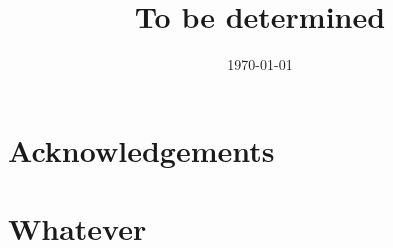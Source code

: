 \documentclass[a4paper,10pt,oneside, fleqn]{article}
\title{To be determined}
\date{\today}
\begin{document}
\maketitle

\pagestyle{fancy}               	%

\vspace*{\fill}
\begin{abstract}

\end{abstract}
\vspace*{\fill}
\newpage

\tableofcontents
\newpage




\section{Acknowledgements}


\newpage 

\appendix
\section{Whatever} 

\newpage


\end{document}
